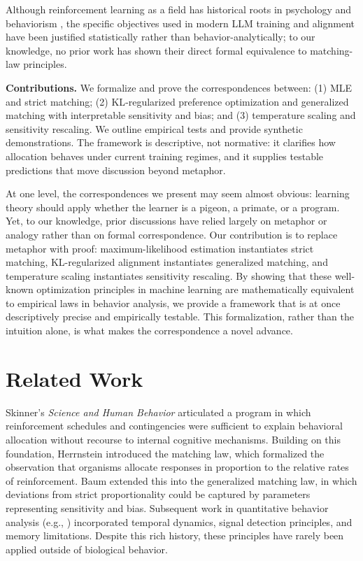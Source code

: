 \documentclass[11pt]{article}
\begin{document}
Although reinforcement learning as a field has historical roots in psychology
and behaviorism \citep{sutton1998reinforcement}, the specific objectives used in modern LLM training and
alignment have been justified statistically rather than behavior-analytically;
to our knowledge, no prior work has shown their direct formal equivalence to
matching-law principles.


\textbf{Contributions.} We formalize and prove the correspondences
between: (1) MLE and strict matching; (2) KL‑regularized preference
optimization and generalized matching with interpretable sensitivity
and bias; and (3) temperature scaling and sensitivity rescaling. We
outline empirical tests and provide synthetic demonstrations. The
framework is descriptive, not normative: it clarifies how allocation
behaves under current training regimes, and it supplies testable
predictions that move discussion beyond metaphor.

At one level, the correspondences we present may seem almost obvious: learning
theory should apply whether the learner is a pigeon, a primate, or a program.
Yet, to our knowledge, prior discussions have relied largely on metaphor or
analogy rather than on formal correspondence. Our contribution is to replace
metaphor with proof: maximum-likelihood estimation instantiates strict matching,
KL-regularized alignment instantiates generalized matching, and temperature
scaling instantiates sensitivity rescaling. By showing that these well-known
optimization principles in machine learning are mathematically equivalent to
empirical laws in behavior analysis, we provide a framework that is at once
descriptively precise and empirically testable. This formalization, rather than
the intuition alone, is what makes the correspondence a novel advance.

\section{Related Work}
Skinner’s \emph{Science and Human Behavior} \citep{skinner1953science} articulated a program in which reinforcement schedules and contingencies were sufficient to explain behavioral allocation without recourse to internal cognitive mechanisms. Building on this foundation, Herrnstein \citep{herrnstein1961matching} introduced the matching law, which formalized the observation that organisms allocate responses in proportion to the relative rates of reinforcement. Baum \citep{baum1974generalized} extended this into the generalized matching law, in which deviations from strict proportionality could be captured by parameters representing sensitivity and bias. Subsequent work in quantitative behavior analysis (e.g., \citealp{shimp1976short,grace1994temporal,killeen1994mathematical}) incorporated temporal dynamics, signal detection principles, and memory limitations. Despite this rich history, these principles have rarely been applied outside of biological behavior.
\end{document}
